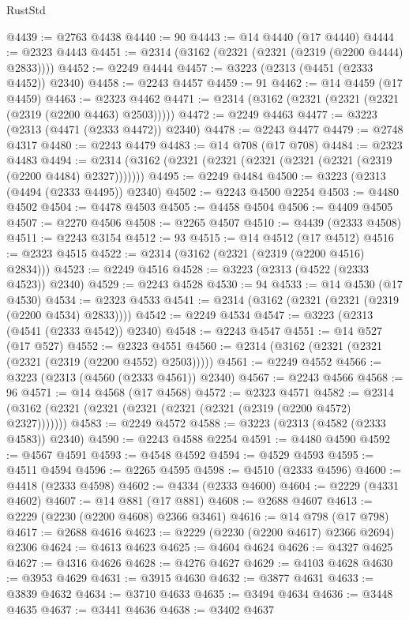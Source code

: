 \begin{lexlean}{RustStd}
\begin{coremodule}
@4439 := @2763 @4438
@4440 := 90
@4443 := @14 @4440 (@17 @4440)
@4444 := @2323 @4443
@4451 := @2314 (@3162 (@2321 (@2321 (@2319 (@2200 @4444) @2833))))
@4452 := @2249 @4444
@4457 := @3223 (@2313 (@4451 (@2333 @4452)) @2340)
@4458 := @2243 @4457
@4459 := 91
@4462 := @14 @4459 (@17 @4459)
@4463 := @2323 @4462
@4471 := @2314 (@3162 (@2321 (@2321 (@2321 (@2319 (@2200 @4463) @2503)))))
@4472 := @2249 @4463
@4477 := @3223 (@2313 (@4471 (@2333 @4472)) @2340)
@4478 := @2243 @4477
@4479 := @2748 @4317
@4480 := @2243 @4479
@4483 := @14 @708 (@17 @708)
@4484 := @2323 @4483
@4494 := @2314 (@3162 (@2321 (@2321 (@2321 (@2321 (@2321 (@2319 (@2200 @4484) @2327)))))))
@4495 := @2249 @4484
@4500 := @3223 (@2313 (@4494 (@2333 @4495)) @2340)
@4502 := @2243 @4500 @2254
@4503 := @4480 @4502
@4504 := @4478 @4503
@4505 := @4458 @4504
@4506 := @4409 @4505
@4507 := @2270 @4506
@4508 := @2265 @4507
@4510 := @4439 (@2333 @4508)
@4511 := @2243 @3154
@4512 := 93
@4515 := @14 @4512 (@17 @4512)
@4516 := @2323 @4515
@4522 := @2314 (@3162 (@2321 (@2319 (@2200 @4516) @2834)))
@4523 := @2249 @4516
@4528 := @3223 (@2313 (@4522 (@2333 @4523)) @2340)
@4529 := @2243 @4528
@4530 := 94
@4533 := @14 @4530 (@17 @4530)
@4534 := @2323 @4533
@4541 := @2314 (@3162 (@2321 (@2321 (@2319 (@2200 @4534) @2833))))
@4542 := @2249 @4534
@4547 := @3223 (@2313 (@4541 (@2333 @4542)) @2340)
@4548 := @2243 @4547
@4551 := @14 @527 (@17 @527)
@4552 := @2323 @4551
@4560 := @2314 (@3162 (@2321 (@2321 (@2321 (@2319 (@2200 @4552) @2503)))))
@4561 := @2249 @4552
@4566 := @3223 (@2313 (@4560 (@2333 @4561)) @2340)
@4567 := @2243 @4566
@4568 := 96
@4571 := @14 @4568 (@17 @4568)
@4572 := @2323 @4571
@4582 := @2314 (@3162 (@2321 (@2321 (@2321 (@2321 (@2321 (@2319 (@2200 @4572) @2327)))))))
@4583 := @2249 @4572
@4588 := @3223 (@2313 (@4582 (@2333 @4583)) @2340)
@4590 := @2243 @4588 @2254
@4591 := @4480 @4590
@4592 := @4567 @4591
@4593 := @4548 @4592
@4594 := @4529 @4593
@4595 := @4511 @4594
@4596 := @2265 @4595
@4598 := @4510 (@2333 @4596)
@4600 := @4418 (@2333 @4598)
@4602 := @4334 (@2333 @4600)
@4604 := @2229 (@4331 @4602)
@4607 := @14 @881 (@17 @881)
@4608 := @2688 @4607
@4613 := @2229 (@2230 (@2200 @4608) @2366 @3461)
@4616 := @14 @798 (@17 @798)
@4617 := @2688 @4616
@4623 := @2229 (@2230 (@2200 @4617) @2366 @2694) @2306
@4624 := @4613 @4623
@4625 := @4604 @4624
@4626 := @4327 @4625
@4627 := @4316 @4626
@4628 := @4276 @4627
@4629 := @4103 @4628
@4630 := @3953 @4629
@4631 := @3915 @4630
@4632 := @3877 @4631
@4633 := @3839 @4632
@4634 := @3710 @4633
@4635 := @3494 @4634
@4636 := @3448 @4635
@4637 := @3441 @4636
@4638 := @3402 @4637

\end{coremodule}
\end{lexlean}
